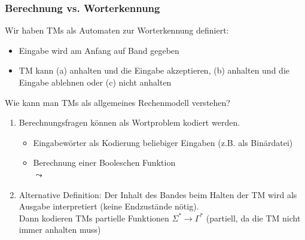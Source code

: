 \documentclass[aspectratio=1610,onlymath]{beamer}
\begin{document}
\begin{frame}\frametitle{Berechnung vs. Worterkennung}

Wir haben TMs als \alert{Automaten zur Worterkennung} definiert:
\begin{itemize}
\item Eingabe wird am Anfang auf Band gegeben
\item TM kann (a) anhalten und die Eingabe akzeptieren, (b) anhalten und die Eingabe ablehnen oder (c) nicht anhalten
\end{itemize}
\bigskip

\alert{Wie kann man TMs als allgemeines Rechenmodell verstehen?}\pause

\begin{enumerate}[(1)]
\item Berechnungsfragen können als Wortproblem kodiert werden.
\begin{itemize}
\item Eingabewörter als Kodierung beliebiger Eingaben (z.B. als Binärdatei)
\item Berechnung einer Booleschen Funktion\\
$\leadsto$ 
\end{itemize}\pause
%
\item Alternative Definition: Der Inhalt des Bandes beim Halten der TM wird als Ausgabe interpretiert (keine Endzustände nötig).\\
Dann kodieren TMs partielle Funktionen $\Sigma^*\to\Gamma^*$ (partiell, da die TM nicht immer anhalten muss)
\end{enumerate}

\end{frame}
\end{document}
